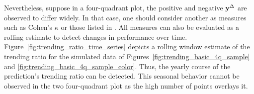Nevertheless, suppose in a four-quadrant plot, the positive and negative $\mathbf{y}^{\Delta}$ are observed to differ widely. In that case, one should consider another as measures such as Cohen's $\kappa$ or those listed in \textcite[Table 3.3]{Jolliffe2012}.
All measures can also be evaluated as a rolling estimate to detect changes in performance over time.
Figure~\ref{fig:trending_ratio_time_series} depicts a rolling window estimate of the trending ratio for the simulated data of Figures~\ref{fig:trending_basic_4q_sample} and \ref{fig:trending_basic_4q_sample_color}.
Thus, the yearly course of the prediction's trending ratio can be detected.
This seasonal behavior cannot be observed in the two four-quadrant plot as the high number of points overlays it.

